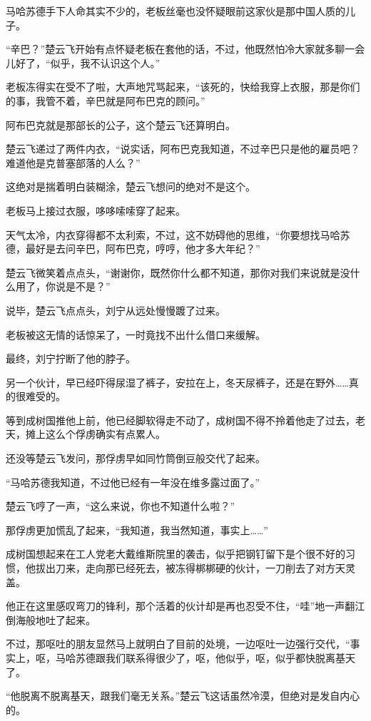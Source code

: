 马哈苏德手下人命其实不少的，老板丝毫也没怀疑眼前这家伙是那中国人质的儿子。

“辛巴？”楚云飞开始有点怀疑老板在套他的话，不过，他既然怕冷大家就多聊一会儿好了，“似乎，我不认识这个人。”

老板冻得实在受不了啦，大声地咒骂起来，“该死的，快给我穿上衣服，那是你们的事，我管不着，辛巴就是阿布巴克的顾问。”

阿布巴克就是那部长的公子，这个楚云飞还算明白。

楚云飞递过了两件内衣，“说实话，阿布巴克我知道，不过辛巴只是他的雇员吧？难道他是克普塞部落的人么？”

这绝对是揣着明白装糊涂，楚云飞想问的绝对不是这个。

老板马上接过衣服，哆哆嗦嗦穿了起来。

天气太冷，内衣穿得都不太利索，不过，这不妨碍他的思维，“你要想找马哈苏德，最好是去问辛巴，阿布巴克，哼哼，他才多大年纪？”

楚云飞微笑着点点头，“谢谢你，既然你什么都不知道，那你对我们来说就是没什么用了，你说是不是？”

说毕，楚云飞点点头，刘宁从远处慢慢踱了过来。

老板被这无情的话惊呆了，一时竟找不出什么借口来缓解。

最终，刘宁拧断了他的脖子。

另一个伙计，早已经吓得尿湿了裤子，安拉在上，冬天尿裤子，还是在野外……真的很难受的。

等到成树国推他上前，他已经脚软得走不动了，成树国不得不拎着他走了过去，老天，摊上这么个俘虏确实有点累人。

还没等楚云飞发问，那俘虏早如同竹筒倒豆般交代了起来。

“马哈苏德我知道，不过他已经有一年没在维多露过面了。”

楚云飞哼了一声，“这么来说，你也不知道什么啦？”

那俘虏更加慌乱了起来，“我知道，我当然知道，事实上……”

成树国想起来在工人党老大戴维斯院里的袭击，似乎把钢钉留下是个很不好的习惯，他拔出刀来，走向那已经死去，被冻得梆梆硬的伙计，一刀削去了对方天灵盖。

他正在这里感叹弯刀的锋利，那个活着的伙计却是再也忍受不住，“哇”地一声翻江倒海般地吐了起来。

不过，那呕吐的朋友显然马上就明白了目前的处境，一边呕吐一边强行交代，“事实上，呕，马哈苏德跟我们联系得很少了，呕，他似乎，呕，似乎都快脱离基天了。

“他脱离不脱离基天，跟我们毫无关系。”楚云飞这话虽然冷漠，但绝对是发自内心的。

